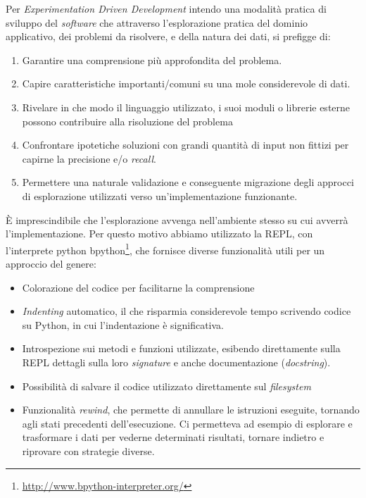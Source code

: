 \documentclass[12pt]{report}
\begin{document}
Per \textit{Experimentation Driven Development} intendo una modalità
pratica di sviluppo del \textit{software} che attraverso l'esplorazione
pratica del dominio applicativo, dei problemi da risolvere, e della natura dei
dati, si prefigge di:

\begin{enumerate}
	\item Garantire una comprensione più approfondita del problema.
	\item Capire caratteristiche importanti/comuni su una mole
considerevole di dati.
  \item Rivelare in che modo il linguaggio utilizzato, i suoi moduli o
librerie esterne possono contribuire alla risoluzione del problema
  \item Confrontare ipotetiche soluzioni con grandi quantità di input
non fittizi per capirne la precisione e/o \textit{recall}.
	\item Permettere una naturale validazione e conseguente migrazione
degli approcci di esplorazione utilizzati verso un'implementazione funzionante.
\end{enumerate}

È imprescindibile che l'esplorazione avvenga nell'ambiente stesso su
cui avverrà l'implementazione. Per questo motivo abbiamo utilizzato la
REPL, con l'interprete python bpython\footnote{
\url{http://www.bpython-interpreter.org/}}, che fornisce diverse
 funzionalità utili per un approccio del genere:

\begin{itemize}
  \item Colorazione del codice per facilitarne la comprensione
  \item \textit{Indenting} automatico, il che risparmia considerevole
tempo scrivendo codice su Python, in cui l'indentazione è significativa.
  \item Introspezione sui metodi e funzioni utilizzate, esibendo
direttamente sulla REPL dettagli sulla loro \textit{signature} e anche
documentazione (\textit{docstring}).
  \item Possibilità di salvare il codice utilizzato direttamente
sul \textit{filesystem}
  \item Funzionalità \textit{rewind}, che permette di annullare le
istruzioni eseguite, tornando agli stati precedenti dell'esecuzione. Ci permetteva ad esempio di esplorare e
trasformare i dati per vederne determinati risultati, tornare indietro 
e riprovare con strategie diverse.
\end{itemize}
\end{document}
